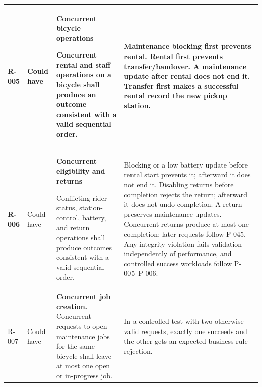 \documentclass[10pt,a4paper,landscape]{article}
\newcommand{\reqtitle}[1]{{\fontsize{11}{13}\selectfont\bfseries #1}\par\nobreak\vspace{2pt}\noindent}
\begin{document}
\begin{longtable}{|C{27mm}|C{25mm}|L{79mm}|L{111mm}|}
\textbf{R-005} & Could have & \reqtitle{Concurrent bicycle operations}Concurrent rental and staff operations on a bicycle shall produce an outcome consistent with a valid sequential order. & Maintenance blocking first prevents rental. Rental first prevents transfer/handover. A maintenance update after rental does not end it. Transfer first makes a successful rental record the new pickup station. \\\hline

\textbf{R-006} & Could have & \reqtitle{Concurrent eligibility and returns}Conflicting rider-status, station-control, battery, and return operations shall produce outcomes consistent with a valid sequential order. & Blocking or a low battery update before rental start prevents it; afterward it does not end it. Disabling returns before completion rejects the return; afterward it does not undo completion. A return preserves maintenance updates. Concurrent returns produce at most one completion; later requests follow F-045. Any integrity violation fails validation independently of performance, and controlled success workloads follow P-005–P-006. \\\hline

R-007 & Could have & \textbf{Concurrent job creation.} Concurrent requests to open maintenance jobs for the same bicycle shall leave at most one open or in-progress job. & In a controlled test with two otherwise valid requests, exactly one succeeds and the other gets an expected business-rule rejection. \\ \hline
\end{longtable}
\endgroup

\end{document}
